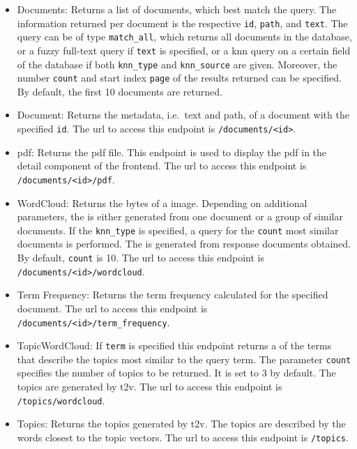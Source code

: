 \begin{itemize}
    \item \label{pt:docs}Documents: 
        Returns a list of documents, which best match the query.
        The information returned per document is the respective \texttt{id}, \texttt{path}, and \texttt{text}.
        The query can be of type \texttt{match\_all}, which returns all documents in the database, 
        or a fuzzy full-text query if \texttt{text} is specified, 
        or a \ac{knn} query on a certain field of the database if both \texttt{knn\_type} and \texttt{knn\_source} are given.
        Moreover, the number \texttt{count} and start index \texttt{page} of the results returned can be specified.
        By default, the first 10 documents are returned.

    \item \label{pt:doc}Document: 
        Returns the metadata, i.e.\ text and path, of a document with the specified \texttt{id}.
        The \ac{url} to access this endpoint is \texttt{/documents/<id>}.

    \item \label{pt:pdf}\ac{pdf}: 
        Returns the \ac{pdf} file.
        This endpoint is used to display the \ac{pdf} in the detail component of the frontend.
        The \ac{url} to access this endpoint is \texttt{/documents/<id>/pdf}.
    
    \item \label{pt:wordcloud}WordCloud: 
        Returns the bytes of a \wordcloud{} image. 
        Depending on additional parameters, the \wordcloud{} is either generated from one document or 
        a group of similar documents.
        If the \texttt{knn\_type} is specified, a query for the \texttt{count} most similar documents is performed.
        The \wordcloud{} is generated from response documents obtained.
        By default, \texttt{count} is 10.
        The \ac{url} to access this endpoint is \texttt{/documents/<id>/wordcloud}.

    \item \label{pt:termfrequency}Term Frequency:
        Returns the term frequency calculated for the specified document.
        The \ac{url} to access this endpoint is \texttt{/documents/<id>/term\_frequency}.
        
    \item \label{pt:topic_wordcloud}TopicWordCloud:
        If \texttt{term} is specified this endpoint returns a \wordcloud{} of the terms that describe the topics most similar to the query term.
        The parameter \texttt{count} specifies the number of topics to be returned.
        It is set to 3 by default.
        The topics are generated by \ac{t2v}.
        The \ac{url} to access this endpoint is \texttt{/topics/wordcloud}.

    \item \label{pt:topic}Topics: 
        Returns the topics generated by \ac{t2v}. 
        The topics are described by the words closest to the topic vectors.
        The \ac{url} to access this endpoint is \texttt{/topics}.
\end{itemize}

